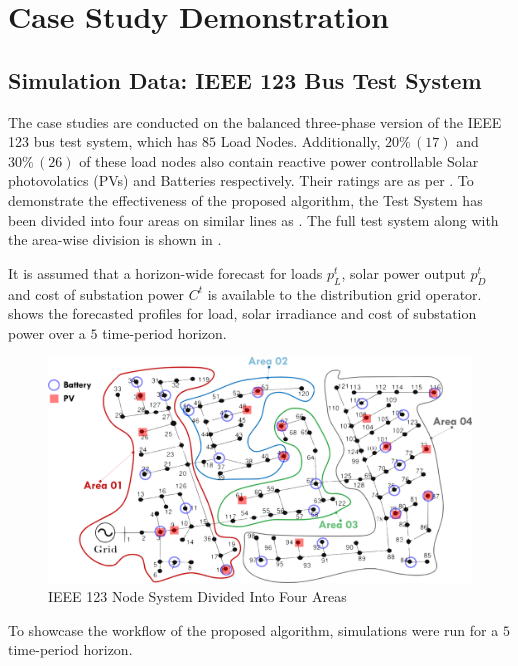 \documentclass[../../outputs/main.tex]{subfiles}
\begin{document}
\section{Case Study Demonstration}

\subsection{Simulation Data: IEEE 123 Bus Test System}
The case studies are conducted on the balanced three-phase version of the IEEE 123 bus test system, which has $85$ Load Nodes. Additionally, $20 \% \, (17)$ and $30 \% \, (26)$ of these load nodes also contain reactive power controllable Solar photovolatics (PVs) and Batteries respectively. Their ratings are as per . To demonstrate the effectiveness of the proposed algorithm, the Test System has been divided into four areas on similar lines as \cite{Sadnan}. The full test system along with the area-wise division is shown in .

It is assumed that a horizon-wide forecast for loads $p^t_L$, solar power output $p^t_D$ and cost of substation power  $C^t$ is available to the distribution grid operator.  shows the forecasted profiles for load, solar irradiance and cost of substation power over a $5$ time-period horizon. 

\begin{figure}[h!]
    \centering
    \includegraphics[width=\linewidth]{../figures/ieee123-FourAreas-pv20-batt30.png}
    \caption{IEEE 123 Node System Divided Into Four Areas}
    \label{fig:ieee123-four-area-figure}
\end{figure}

To showcase the workflow of the proposed algorithm, simulations were run for a $5$ time-period horizon. 
\end{document}

